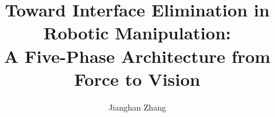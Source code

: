\documentclass[11pt,letterpaper]{article}
\title{Toward Interface Elimination in Robotic Manipulation:\\
       A Five-Phase Architecture from Force to Vision}
\author{Jianghan Zhang}
\date{}
\begin{document}
\maketitle

\begin{abstract}
\end{abstract}












\appendix






\end{document}
